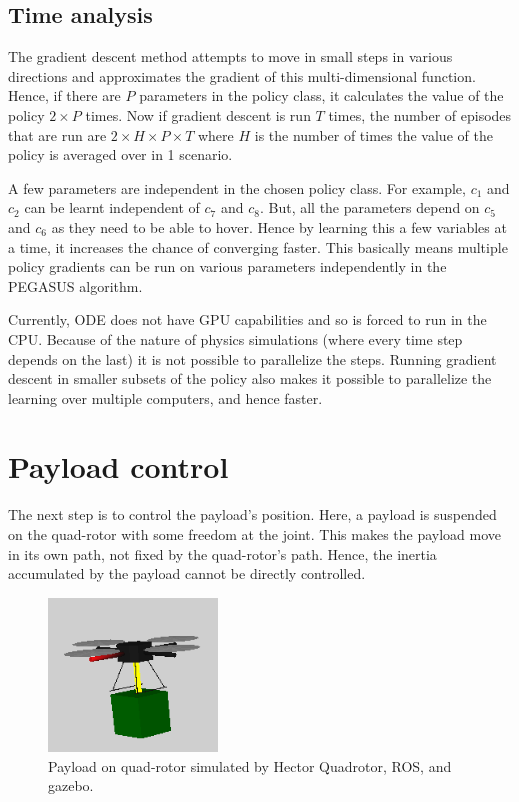 \documentclass[hidelinks,BTech]{iitmdiss}
\begin{document}
\subsection{Time analysis}

The gradient descent method attempts to move in small steps in various directions and approximates the gradient of this multi-dimensional function. Hence, if there are $P$ parameters in the policy class, it calculates the value of the policy $2 \times P$ times. Now if gradient descent is run $T$ times, the number of episodes that are run are $2 \times H \times P \times T$ where $H$ is the number of times the value of the policy is averaged over in 1 scenario.

A few parameters are independent in the chosen policy class. For example, $c_1$ and $c_2$ can be learnt independent of $c_7$ and $c_8$. But, all the parameters depend on $c_5$ and $c_6$ as they need to be able to hover. Hence by learning this a few variables at a time, it increases the chance of converging faster. This basically means multiple policy gradients can be run on various parameters independently in the PEGASUS algorithm.

Currently, ODE does not have GPU capabilities and so is forced to run in the CPU. Because of the nature of physics simulations (where every time step depends on the last) it is not possible to parallelize the steps. Running gradient descent in smaller subsets of the policy also makes it possible to parallelize the learning over multiple computers, and hence faster.

\section{Payload control}

The next step is to control the payload's position. Here, a payload is suspended on the quad-rotor with some freedom at the joint. This makes the payload move in its own path, not fixed by the quad-rotor's path. Hence, the inertia accumulated by the payload cannot be directly controlled.

\begin{figure}[H]
  \centering
    \includegraphics[width=0.4\textwidth]{payload_sim.png}
    \caption{Payload on quad-rotor simulated by Hector Quadrotor, ROS, and gazebo.}
\end{figure}
\end{document}
